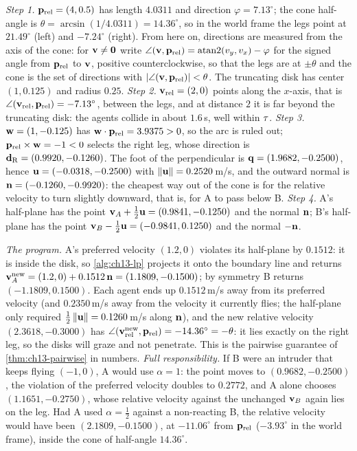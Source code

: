 \emph{Step 1.} $\mathbf{p}_{\mathrm{rel}} = (4, 0.5)$ has length $4.0311$ and
direction $\varphi = 7.13^\circ$; the cone half-angle is $\theta =
\arcsin(1/4.0311) = 14.36^\circ$, so in the world frame the legs point at
$21.49^\circ$ (left) and $-7.24^\circ$ (right). From here on, directions are
measured from the axis of the cone: for $\mathbf{v} \ne \mathbf{0}$ write
$\angle(\mathbf{v}, \mathbf{p}_{\mathrm{rel}}) = \mathrm{atan2}(v_y, v_x) - \varphi$ for the
signed angle from $\mathbf{p}_{\mathrm{rel}}$ to $\mathbf{v}$, positive counterclockwise,
so that the legs are at $\pm\theta$ and the cone is the set of directions with
$\left\lvert \angle(\mathbf{v}, \mathbf{p}_{\mathrm{rel}}) \right\rvert < \theta$. The truncating disk has center $(1, 0.125)$ and
radius $0.25$. \emph{Step 2.} $\mathbf{v}_{\mathrm{rel}} = (2, 0)$ points along
the $x$-axis, that is
$\angle(\mathbf{v}_{\mathrm{rel}}, \mathbf{p}_{\mathrm{rel}}) = -7.13^\circ$, between the
legs, and at distance $2$ it is far beyond the
truncating disk: the agents collide in about $1.6$\,s, well within
$\tau$. \emph{Step 3.} $\mathbf{w} = (1, -0.125)$ has
$\mathbf{w}\cdot\mathbf{p}_{\mathrm{rel}} = 3.9375 > 0$, so the arc is ruled out;
$\mathbf{p}_{\mathrm{rel}} \times \mathbf{w} = -1 < 0$ selects the right leg, whose
direction is $\mathbf{d}_{\mathrm{R}} = (0.9920, -0.1260)$. The foot of the
perpendicular is $\mathbf{q} = (1.9682, -0.2500)$, hence
$\mathbf{u} = (-0.0318, -0.2500)$ with $\left\lVert \mathbf{u} \right\rVert = 0.2520$\,m/s, and the
outward normal is $\mathbf{n} = (-0.1260, -0.9920)$: the cheapest way out of
the cone is for the relative velocity to turn slightly downward,
that is, for A to pass below B. \emph{Step 4.} A's half-plane has the point
$\mathbf{v}_A + \tfrac12\mathbf{u} = (0.9841, -0.1250)$ and the normal $\mathbf{n}$;
B's half-plane has the point $\mathbf{v}_B - \tfrac12\mathbf{u} = (-0.9841, 0.1250)$
and the normal $-\mathbf{n}$.

\emph{The program.} A's preferred velocity $(1.2, 0)$ violates its
half-plane by $0.1512$: it is inside the disk, so \cref{alg:ch13-lp} projects
it onto the boundary line and returns
$\mathbf{v}_A^{\mathrm{new}} = (1.2, 0) + 0.1512\,\mathbf{n} = (1.1809, -0.1500)$;
by symmetry B returns $(-1.1809, 0.1500)$. Each agent ends up $0.1512$\,m/s
away from its preferred velocity (and $0.2350$\,m/s away from the velocity it
currently flies; the half-plane only required
$\tfrac12\left\lVert \mathbf{u} \right\rVert = 0.1260$\,m/s along $\mathbf{n}$), and the new relative
velocity $(2.3618, -0.3000)$ has
$\angle(\mathbf{v}_{\mathrm{rel}}^{\mathrm{new}}, \mathbf{p}_{\mathrm{rel}}) = -14.36^\circ = -\theta$:
it lies exactly on the right leg, so the disks will graze and not
penetrate. This is the pairwise guarantee of
\cref{thm:ch13-pairwise} in numbers. \emph{Full responsibility.} If B were an
intruder that keeps flying $(-1, 0)$, A would use $\alpha = 1$: the point
moves to $(0.9682, -0.2500)$, the violation of the preferred velocity
doubles to $0.2772$, and A alone chooses $(1.1651, -0.2750)$, whose
relative velocity against the unchanged $\mathbf{v}_B$ again lies on the leg. Had
A used $\alpha = \tfrac12$ against a non-reacting B, the relative velocity
would have been $(2.1809, -0.1500)$, at $-11.06^\circ$ from
$\mathbf{p}_{\mathrm{rel}}$ ($-3.93^\circ$ in the world frame), inside the cone of
half-angle $14.36^\circ$.

